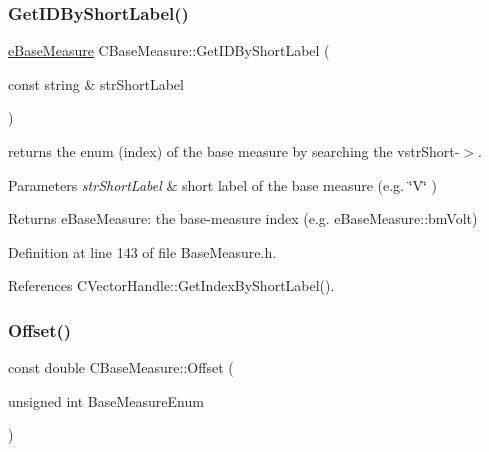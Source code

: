 \mbox{\label{classCBaseMeasure_a8476cf22a5fdcde4df0efc05cde70b45}} 
\subsubsection{\texorpdfstring{Get\+I\+D\+By\+Short\+Label()}{GetIDByShortLabel()}}
{\footnotesize\ttfamily \hyperlink{BaseMeasure_8h_ac90e5164ccf1f0d648fba7e94b229a11}{e\+Base\+Measure} C\+Base\+Measure\+::\+Get\+I\+D\+By\+Short\+Label (\begin{DoxyParamCaption}\item[{const string \&}]{str\+Short\+Label }\end{DoxyParamCaption})\hspace{0.3cm}{\ttfamily [inline]}}



returns the enum (index) of the base measure by searching the vstr\+Short-\/$>$. 


\begin{DoxyParams}{Parameters}
{\em str\+Short\+Label} & short label of the base measure (e.\+g. \char`\"{}\+V\char`\"{} ) \\
\hline
\end{DoxyParams}
\begin{DoxyReturn}{Returns}
e\+Base\+Measure\+: the base-\/measure index (e.\+g. e\+Base\+Measure\+::bm\+Volt) 
\end{DoxyReturn}


Definition at line 143 of file Base\+Measure.\+h.



References C\+Vector\+Handle\+::\+Get\+Index\+By\+Short\+Label().

\mbox{\label{classCBaseMeasure_abae752b654d90bcf0fa795cc9d4fb0ac}} 
\subsubsection{\texorpdfstring{Offset()}{Offset()}}
{\footnotesize\ttfamily const double C\+Base\+Measure\+::\+Offset (\begin{DoxyParamCaption}\item[{unsigned int}]{Base\+Measure\+Enum }\end{DoxyParamCaption})\hspace{0.3cm}{\ttfamily [inline]}}



